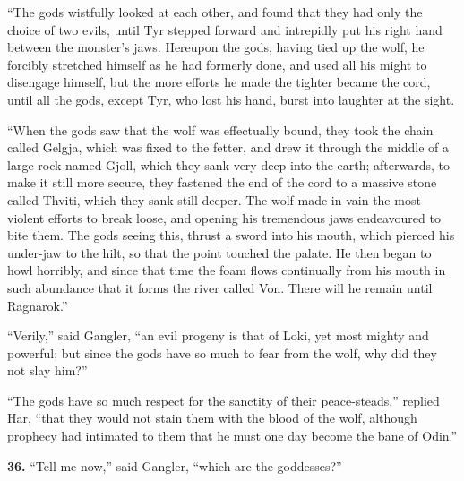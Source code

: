 ``The gods wistfully looked at each other, and found that they had
only the choice of two evils, until Tyr stepped forward and intrepidly
put his right hand between the monster's jaws. Hereupon the gods,
having tied up the wolf, he forcibly stretched himself as he had
formerly done, and used all his might to disengage himself, but the
more efforts he made the tighter became the cord, until all the gods,
except Tyr, who lost his hand, burst into laughter at the sight.

``When the gods saw that the wolf was effectually bound, they took the
chain called Gelgja, which was fixed to the fetter, and drew it
through the middle of a large rock named Gjoll, which they sank very
deep into the earth; afterwards, to make it still more secure, they
fastened the end of the cord to a massive stone called Thviti, which
they sank still deeper. The wolf made in vain the most violent efforts
to break loose, and opening his tremendous jaws endeavoured to bite
them. The gods seeing this, thrust a sword into his mouth, which
pierced his under-jaw to the hilt, so that the point touched the
palate. He then began to howl horribly, and since that time the foam
flows continually from his mouth in such abundance that it forms the
river called Von. There will he remain until Ragnarok.''

``Verily,'' said Gangler, ``an evil progeny is that of Loki, yet most
mighty and powerful; but since the gods have so much to fear from the
wolf, why did they not slay him?''

``The gods have so much respect for the sanctity of their
peace-steads,'' replied Har, ``that they would not stain them with the
blood of the wolf, although prophecy had intimated to them that he
must one day become the bane of Odin.''


\textbf{36.} ``Tell me now,'' said Gangler, ``which are the goddesses?''

